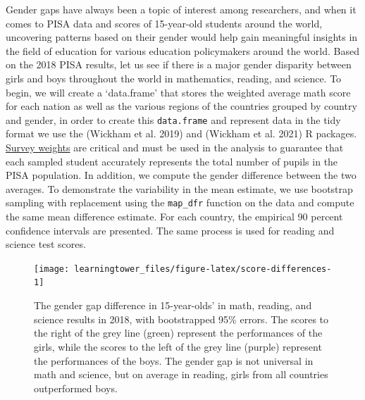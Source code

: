 Gender gaps have always been a topic of interest among researchers, and when it comes to PISA data and scores of 15-year-old students around the world, uncovering patterns based on their gender would help gain meaningful insights in the field of education for various education policymakers around the world. Based on the 2018 PISA results, let us see if there is a major gender disparity between girls and boys throughout the world in mathematics, reading, and science. To begin, we will create a `data.frame' that stores the weighted average math score for each nation as well as the various regions of the countries grouped by country and gender, in order to create this \texttt{data.frame} and represent data in the tidy format we use the  (Wickham et al. 2019) and  (Wickham et al. 2021) R packages. \href{https://www.oecd.org/pisa/data/2015-technical-report/PISA-2015-Technical-Report-Chapter-8-Survey-Weighting.pdf}{Survey weights} are critical and must be used in the analysis to guarantee that each sampled student accurately represents the total number of pupils in the PISA population. In addition, we compute the gender difference between the two averages. To demonstrate the variability in the mean estimate, we use bootstrap sampling with replacement using the \texttt{map\_dfr} function on the data and compute the same mean difference estimate. For each country, the empirical 90 percent confidence intervals are presented. The same process is used for reading and science test scores.

\begin{figure}[H]
\texttt{[image: learningtower\_files/figure-latex/score-differences-1]} \caption{The gender gap difference in 15-year-olds' in math, reading, and science results in 2018, with bootstrapped 95\% errors. The scores to the right of the grey line (green) represent the performances of the girls, while the scores to the left of the grey line (purple) represent the performances of the boys. The gender gap is not universal in math and science, but on average in reading, girls from all countries outperformed boys.}\label{fig:score-differences}
\end{figure}

